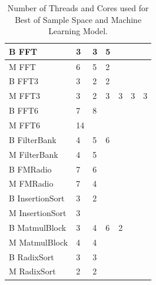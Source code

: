 \begin{table}[t]
{\begin{minipage}{0.5\textwidth}
\begin{tabular} { | l | l | l | l | l | l | l |}
	B FFT & 3 & 3 & 5 & \cellcolor[gray]{0.3}& \cellcolor[gray]{0.3}& \cellcolor[gray]{0.3} \\ \hline
    M FFT & 6& 5 & 2& \cellcolor[gray]{0.3}& \cellcolor[gray]{0.3}& \cellcolor[gray]{0.3}  \\ \hline\hline
    B FFT3 & 3 & 2 & 2& \cellcolor[gray]{0.3}& \cellcolor[gray]{0.3}& \cellcolor[gray]{0.3} \\ \hline 
    M FFT3 & 3 & 2 & 3 & 3& 3& 3 \\ \hline\hline
    B FFT6 & 7 & 8& \cellcolor[gray]{0.3}& \cellcolor[gray]{0.3}& \cellcolor[gray]{0.3}& \cellcolor[gray]{0.3}\\ \hline
    M FFT6& 14 & \cellcolor[gray]{0.3}& \cellcolor[gray]{0.3}& \cellcolor[gray]{0.3}& \cellcolor[gray]{0.3}& \cellcolor[gray]{0.3} \\ \hline\hline
    B FilterBank & 4 & 5 & 6& \cellcolor[gray]{0.3}& \cellcolor[gray]{0.3}& \cellcolor[gray]{0.3} \\ \hline
    M FilterBank & 4 & 5 & \cellcolor[gray]{0.3} & \cellcolor[gray]{0.3}& \cellcolor[gray]{0.3}& \cellcolor[gray]{0.3}\\ \hline\hline
    B FMRadio & 7 & 6 & \cellcolor[gray]{0.3}& \cellcolor[gray]{0.3}& \cellcolor[gray]{0.3}& \cellcolor[gray]{0.3}\\ \hline
    M FMRadio & 7 & 4 & \cellcolor[gray]{0.3} & \cellcolor[gray]{0.3}& \cellcolor[gray]{0.3}& \cellcolor[gray]{0.3} \\ \hline\hline
    B InsertionSort & 3 & 2& \cellcolor[gray]{0.3}& \cellcolor[gray]{0.3}& \cellcolor[gray]{0.3}& \cellcolor[gray]{0.3} \\ \hline
    M InsertionSort & 3 & \cellcolor[gray]{0.3}& \cellcolor[gray]{0.3}& \cellcolor[gray]{0.3}& \cellcolor[gray]{0.3}& \cellcolor[gray]{0.3}\\ \hline\hline
    B MatmulBlock & 3 & 4 & 6 & 2 & \cellcolor[gray]{0.3} & \cellcolor[gray]{0.3}\\ \hline
    M MatmulBlock & 4 & 4 & \cellcolor[gray]{0.3}& \cellcolor[gray]{0.3}& \cellcolor[gray]{0.3}& \cellcolor[gray]{0.3}\\ \hline\hline
    B RadixSort & 3 & 3& \cellcolor[gray]{0.3}& \cellcolor[gray]{0.3}& \cellcolor[gray]{0.3}& \cellcolor[gray]{0.3}\\ \hline
    M RadixSort & 2 & 2& \cellcolor[gray]{0.3}& \cellcolor[gray]{0.3}& \cellcolor[gray]{0.3}& \cellcolor[gray]{0.3}\\ \hline
    
 \end{tabular}
  \end{minipage}}
  \caption{Number of Threads and Cores used for Best of Sample Space and Machine Learning Model.}\label{tab:summary}

\end{table}

